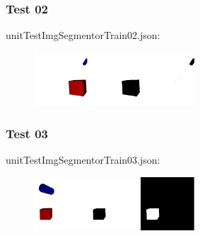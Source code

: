 \subsubsection{Test 02}

unitTestImgSegmentorTrain02.json:\\
\begin{scriptsize}
\begin{ttfamily}

\end{ttfamily}
\end{scriptsize}
\begin{center}
\begin{figure}[H]
\centering\includegraphics[width=6cm]{imgSegmentorTest02.png}
\end{figure}
\end{center}

\subsubsection{Test 03}

unitTestImgSegmentorTrain03.json:\\
\begin{scriptsize}
\begin{ttfamily}

\end{ttfamily}
\end{scriptsize}
\begin{center}
\begin{figure}[H]
\centering\includegraphics[width=6cm]{imgSegmentorTest03.png}
\end{figure}
\end{center}
